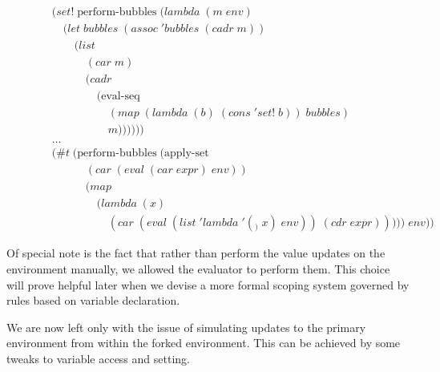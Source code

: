\begin{figure}[htp]
\footnotesize
\caption{}\label{fig:performBubblesDef}
\begin{align*}
& (set! \; \text{perform-bubbles} \; (lambda \; (m \; env)
\\& \quad (let \; bubbles \; (assoc \; 'bubbles \; (cadr \; m))
\\& \qquad (list
\\& \qquad \quad (car \; m)
\\& \qquad \quad (cadr \; 
\\& \qquad \qquad (\text{eval-seq}
\\& \qquad \qquad \quad (map \; (lambda \; (b) \; (cons \; 'set! \; b)) \; bubbles)
\\& \qquad \qquad \quad m))))))
\\& \dots
\\& (\#t \; (\text{perform-bubbles} \; (\text{apply-set} \; 
\\& \qquad \quad (car \; (eval \; (car \; expr) \; env))
\\& \qquad \quad (map \; 
\\& \qquad \qquad (lambda \; (x) \; 
\\& \qquad \qquad \quad (car \; (eval \; (list \; 'lambda \; '(_) \; x) \; env)) \; (cdr \; expr))))) \; env))
\end{align*}
\end{figure}

Of special note is the fact that rather than perform the value updates on the
environment manually, we allowed the evaluator to perform them. This choice
will prove helpful later when we devise a more formal scoping system governed
by rules based on variable declaration.

We are now left only with the issue of simulating updates to the primary
environment from within the forked environment. This can be achieved by some
tweaks to variable access and setting.

